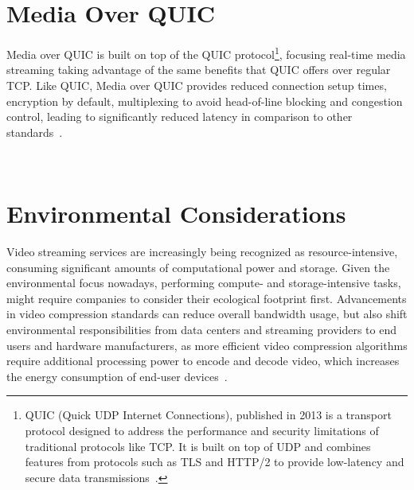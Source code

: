 \section{Media Over QUIC}

Media over QUIC is built on top of the QUIC protocol\footnote{QUIC (Quick UDP Internet Connections), published in 2013 is a transport protocol designed to address the performance and security limitations of traditional protocols like TCP. It is built on top of UDP and combines features from protocols such as TLS and HTTP/2 to provide low-latency and secure data transmissions~\parencite{quic}.}, focusing real-time media streaming taking advantage of the same benefits that QUIC offers over regular TCP. Like QUIC, Media over QUIC provides reduced connection setup times, encryption by default, multiplexing to avoid head-of-line blocking and congestion control, leading to significantly reduced latency in comparison to other standards~\parencite{moq_ieft}.

~\parencite{moq_project}

\section{Environmental Considerations}

Video streaming services are increasingly being recognized as resource-intensive, consuming significant amounts of computational power and storage. Given the environmental focus nowadays, performing compute- and storage-intensive tasks, might require companies to consider their ecological footprint first. Advancements in video compression standards can reduce overall bandwidth usage, but also shift environmental responsibilities from data centers and streaming providers to end users and hardware manufacturers, as more efficient video compression algorithms require additional processing power to encode and decode video, which increases the energy consumption of end-user devices~\parencite{save_environment}.
